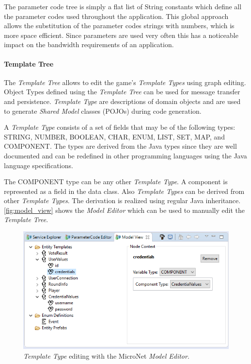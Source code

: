 The parameter code tree is simply a flat list of String constants which define
all the parameter codes used throughout the application. This global approach
allows the substitution of the parameter codes strings with numbers, which is
more space efficient. Since parameters are used very often this has a noticeable
impact on the bandwidth requirements of an application.

\paragraph{Template Tree}

The \textit{Template Tree} allows to edit the game's \textit{Template Types}
using graph editing. Object Types defined using the \textit{Template Tree} can
be used for message transfer and persistence. \textit{Template Type} are
descriptions of domain objects and are used to generate \textit{Shared Model}
classes (POJOs) during code generation.

A \textit{Template Type} consists of a set of fields that may be of the
following types: STRING, NUMBER, BOOLEAN, CHAR, ENUM, LIST, SET, MAP, and
COMPONENT. The types are derived from the Java types since they are well
documented and can be redefined in other programming languages using the Java
language specifications.

The COMPONENT type can be any other \textit{Template Type}. A component is
represented as a field in the data class. Also \textit{Template Types} can be
derived from other \textit{Template Types}. The derivation is realized using
regular Java inheritance. \autoref{fig:model_view} shows the \textit{Model
Editor} which can be used to manually edit the \textit{Template Tree}.

\begin{figure}
	\centering
	\includegraphics[width=\textwidth]{images/tools/ModelView}
	\caption{\textit{Template Type} editing with the MicroNet \textit{Model Editor}.}
	\label{fig:model_view}
\end{figure}


